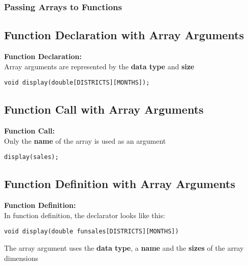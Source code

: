 \documentclass{beamer}
\begin{document}
\begin{frame}\frametitle{Passing Arrays to Functions}
    \subsection{Function Declaration with Array Arguments} %
    \label{sub:function_declaration_with_array_arguments}
    \textbf{Function Declaration:} \\
    Array arguments are represented by the \textbf{data type} and \textbf{size}
    \begin{center}
        \texttt{void display(double[DISTRICTS][MONTHS]);} \\
    \end{center}

    \subsection{Function Call with Array Arguments} %
    \label{sub:function_call_with_array_arguments}
    \textbf{Function Call:} \\
    Only the \textbf{name} of the array is used as an argument
    \begin{center}
        \texttt{display(sales);}
    \end{center}

    \subsection{Function Definition with Array Arguments} %
    \label{sub:function_definition_with_array_arguments}
    \textbf{Function Definition:} \\
    In function definition, the declarator looks like this:
    \begin{center}
        \texttt{void display(double funsales[DISTRICTS][MONTHS])}
    \end{center}
    The array argument uses the \textbf{data type}, a \textbf{name} and the \textbf{sizes} of the array dimensions
\end{frame}
\end{document}
